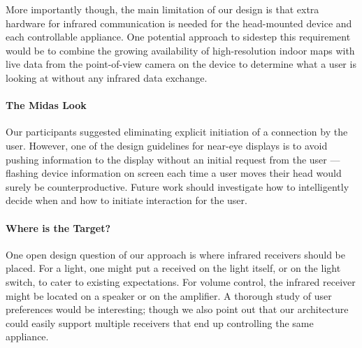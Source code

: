 More importantly though, the main limitation of our design is that extra hardware for infrared communication is needed for the head-mounted device and each controllable appliance. One potential approach to sidestep this requirement would be to combine the growing availability of high-resolution indoor maps with live data from the point-of-view camera on the device to determine what a user is looking at without any infrared data exchange.

\paragraph{The Midas Look}
Our participants suggested eliminating explicit initiation of a connection by the user. However, one of the design guidelines for near-eye displays is to avoid pushing information to the display without an initial request from the user --- flashing device information on screen each time a user moves their head would surely be counterproductive. Future work should investigate how to intelligently decide when and how to initiate interaction for the user.

\paragraph{Where is the Target?}
One open design question of our approach is where infrared receivers should be placed. For a light, one might put a received on the light itself, or on the light switch, to cater to existing expectations. For volume control, the infrared receiver might be located on a speaker or on the amplifier. A thorough study of user preferences would be interesting; though we also point out that our architecture could easily support multiple receivers that end up controlling the same appliance.





